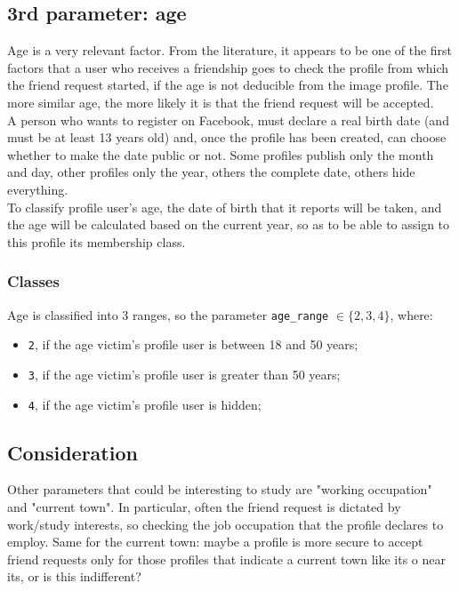 \subsection{3rd parameter: age} 
Age is a very relevant factor. From the literature, it appears to be one of the first factors that a user who receives a friendship goes to check the profile from which the friend request started, if the age is not deducible from the image profile. 
The more similar age, the more likely it is that the friend request will be accepted.\\
A person who wants to register on Facebook, must declare a real birth date (and must be at least 13 years old) and, once the profile has been created, can choose whether to make the date public or not. Some profiles publish only the month and day, other profiles only the year, others the complete date, others hide everything.\\To classify profile user's age, the date of birth that it reports will be taken, and the age will be calculated based on the current year, so as to be able to assign to this profile its membership class.
\subsubsection*{Classes}
Age is classified into 3 ranges, so the parameter \texttt{age\_range} $ \in \{2,3,4\}$, where: 
\begin{itemize}
	\item \texttt{2}, if the age victim's profile user is between 18 and 50 years;
	\item \texttt{3}, if the age victim's profile user is greater than 50 years;
	\item \texttt{4}, if the age victim's profile user is hidden;
\end{itemize}

\subsection{Consideration}
Other parameters that could be interesting to study are "working occupation" and "current town". 
In particular, often the friend request is dictated by work/study interests, so checking the job occupation that the profile declares to employ. Same for the current town: maybe a profile is more secure to accept friend requests only for those profiles that indicate a current town like its o near its, or is this indifferent?

